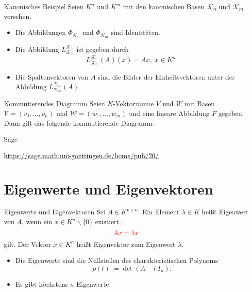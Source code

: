 \documentclass[hyperref={xetex}]{beamer}
\begin{document}
\begin{frame}{Kanonisches Beispiel}
Seien $K^n$ und $K^m$ mit den kanonischen Basen $\mathcal{K}_n$ und
$\mathcal{K}_m$ versehen.
\begin{itemize}
\item Die Abbildungen $\Phi_{\mathcal{K}_n}$ und $\Phi_{\mathcal{K}_m}$
sind Identitäten.
\item  Die Abbildung $L^{\mathcal{K}_n}_{\mathcal{K}_m}$ ist gegeben
durch 
\[ L^{\mathcal{K}_n}_{\mathcal{K}_m} (A)(x)=Ax,\; x \in K^n. \]
\item Die Spaltenvektoren von $A$ sind die Bilder der Einheitsvektoren
unter der Abbildung  $L^{\mathcal{K}_n}_{\mathcal{K}_m}(A)$.
\end{itemize}
\end{frame}

\begin{frame}[fragile]{Kommutierendes Diagramm}
  Seien $K$-Vektorräume $V$ und $W$ mit Basen $\mathcal{V}=(v_1, \dots
,v_n)$ und $\mathcal{W}=(w_1, \dots ,w_m)$ und eine lineare Abbildung
$F$ gegeben. Dann gilt das folgende kommutierende Diagramm:\\
\begin{center}
\end{center}
\end{frame}

\begin{frame}{Sage}
    \begin{center}
        \url{https://sage.math.uni-goettingen.de/home/pub/20/}
    \end{center}
\end{frame}

\section{Eigenwerte und Eigenvektoren}

\begin{frame}{Eigenwerte und Eigenvektoren}
Sei $A\in K^{n\times n}$. Ein Element $\lambda \in K$ heißt {\color{red} Eigenwert} von
$A$, wenn ein $x \in K^n\smallsetminus \{0 \}$ existiert, 
\[ {\color{red}A x = \lambda x} \] 
gilt. Der Vektor $x \in K^n$ heißt {\color{red} Eigenvektor} zum Eigenwert $\lambda$.
\begin{itemize}
\item Die Eigenwerte sind die Nullstellen des {\color{red} charakteristischen
Polynoms} 
\[p(t):=\det(A-t \ I_n).\] 
\item Es gibt höchstens $n$ Eigenwerte.
\end{itemize}
\end{frame}
\end{document}
